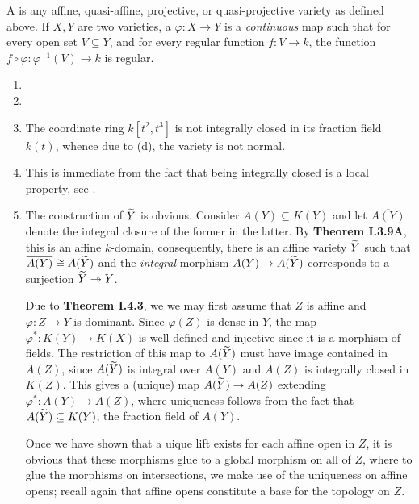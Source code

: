 \begin{definition}
    A  is any affine, quasi-affine, projective, or quasi-projective variety as defined above. If $X, Y$ are two varieties, a  $\varphi: X\to Y$ is a \emph{continuous} map such that for every open set $V\subseteq Y$, and for every regular function $f: V\to k$, the function $f\circ\varphi: \varphi^{-1}(V)\to k$ is regular.
\end{definition}

\setcounter{exercise}{16}
\begin{exercise}
\begin{enumerate}[label=(\alph*)]
    \item
    \item
    \item The coordinate ring $k[t^2, t^3]$ is not integrally closed in its fraction field $k(t)$, whence due to (d), the variety is not normal.
    \item This is immediate from the fact that being integrally closed is a local property, see \cite[Chapter V]{atiyah}.
    \item The construction of $\widetilde{Y}$ is obvious. Consider $A(Y)\subseteq K(Y)$ and let $\overline{A(Y)}$ denote the integral closure of the former in the latter. By \textbf{Theorem I.3.9A}, this is an affine $k$-domain, consequently, there is an affine variety $\widetilde{Y}$ such that $\overline{A(Y)}\cong A(\widetilde{Y})$ and the \emph{integral} morphism $A(Y)\to A(\widetilde{Y})$ corresponds to a surjection $\widetilde{Y}\twoheadrightarrow Y$.
    
    Due to \textbf{Theorem I.4.3}, we we may first assume that $Z$ is affine and $\varphi: Z\to Y$ is dominant. Since $\varphi(Z)$ is dense in $Y$, the map $\varphi^\ast: K(Y)\to K(X)$ is well-defined and injective since it is a morphism of fields. The restriction of this map to $A(\widetilde{Y})$ must have image contained in $A(Z)$, since $A(\widetilde{Y})$ is integral over $A(Y)$ and $A(Z)$ is integrally closed in $K(Z)$. This gives a (unique) map $A(\widetilde{Y})\to A(Z)$ extending $\varphi^\ast: A(Y)\to A(Z)$, where uniqueness follows from the fact that $A(\widetilde{Y})\subseteq K(Y)$, the fraction field of $A(Y)$. 

    Once we have shown that a uique lift exists for each affine open in $Z$, it is obvious that these morphisms glue to a global morphism on all of $Z$, where to glue the morphisms on intersections, we make use of the uniqueness on affine opens; recall again that affine opens constitute a base for the topology on $Z$.
\end{enumerate}
\end{exercise}

